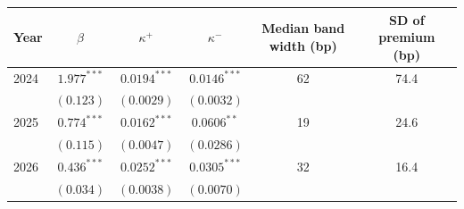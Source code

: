 \begin{tabular}{lccccc}
\toprule
 Year & $\beta$ & $\kappa^+$ & $\kappa^-$ & Median band width (bp) & SD of premium (bp) \\
\midrule
2024 & $1.977^{***}$ & $0.0194^{***}$ & $0.0146^{***}$ & 62 & 74.4 \\
 & $(0.123)$ & $(0.0029)$ & $(0.0032)$ & & \\
2025 & $0.774^{***}$ & $0.0162^{***}$ & $0.0606^{**}$ & 19 & 24.6 \\
 & $(0.115)$ & $(0.0047)$ & $(0.0286)$ & & \\
2026 & $0.436^{***}$ & $0.0252^{***}$ & $0.0305^{***}$ & 32 & 16.4 \\
 & $(0.034)$ & $(0.0038)$ & $(0.0070)$ & & \\
\bottomrule
\end{tabular}

